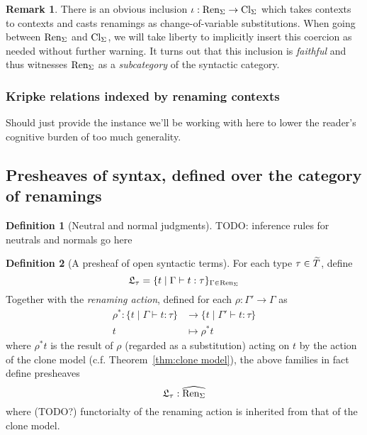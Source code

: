 \documentclass[12pt,twoside]{reedthesis}
\theoremstyle{definition}
\newtheorem{definition}{Definition}
\newtheorem{remark}{Remark}
\theoremstyle{remark}
\theoremstyle{plain}
\begin{document}
\begin{remark}\label{rmk:reninclusioncl}
  There is an obvious inclusion \( \iota : \text{Ren}_\Sigma \rightarrow \text{Cl}_\Sigma \) which takes contexts to
  contexts and casts renamings as change-of-variable substitutions. When going
  between \( \text{Ren}_\Sigma \) and \( \text{Cl}_\Sigma \), we will take liberty to implicitly insert
  this coercion as needed without further warning. It turns out that this
  inclusion is \emph{faithful} and thus witnesses \( \text{Ren}_\Sigma \) as a
  \emph{subcategory} of the syntactic category.
\end{remark}

\subsubsection{Kripke relations indexed by renaming contexts}
Should just provide the instance we'll be working with here to lower the
reader's cognitive burden of too much generality.

\subsection{Presheaves of syntax, defined over the category of renamings}

\begin{definition}[Neutral and normal judgments]
  TODO: inference rules for neutrals and normals go here
\end{definition}

\begin{definition}[A presheaf of open syntactic terms]
  For each type $\tau \in \widetilde{T}$, define
  \[
    \mathfrak{L}_{\tau} = \{ t \mid \Gamma \vdash t : \tau \}_{\Gamma \in \text{Ren}_\Sigma}
  \]
  Together with the \emph{renaming action}, defined for each $\rho : \Gamma' \rightarrow \Gamma $ as
  \begin{align*}
    \rho^{*} : \{ t \mid \Gamma \vdash t : \tau \} &\rightarrow \{ t \mid \Gamma' \vdash t : \tau \} \\
                             t &\mapsto \rho^{*}t
  \end{align*}
  where \( \rho^{*}t\) is the result of \( \rho \) (regarded as a substitution) acting
  on \( t \) by the action of the clone model (c.f. Theorem~\ref{thm:clone
    model}), the above families in fact define presheaves
  \[
    \mathfrak{L}_{\tau} : \widehat{\text{Ren}_\Sigma}
  \]
  where (TODO?) functorialty of the renaming action is inherited from that of
  the clone model.
\end{definition}
\end{document}
